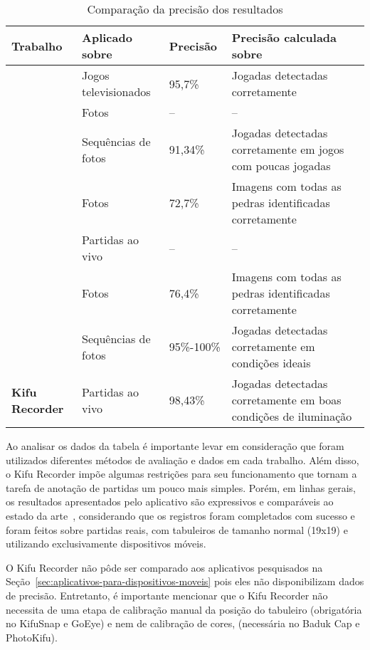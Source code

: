 \begin{table}[htb]
    \label{tab:comparacao-precisao}
    
    \begin{footnotesize}
    \begin{center}
    \begin{tabular}{p{4.6cm}|p{3.2cm}|p{1.6cm}|p{5cm}}
    
    \textbf{Trabalho} & \textbf{Aplicado sobre} & \textbf{Precisão} & \textbf{Precisão calculada sobre}\\
    \hline
    \cite{yanai06} & Jogos televisionados & 95,7\% & Jogadas detectadas corretamente\\
    \hline
    \cite{hirsimaki05} & Fotos & -- & --\\
    \hline
    \cite{scher08} & Sequências de fotos & 91,34\% & Jogadas detectadas corretamente em jogos com poucas jogadas\\
    \hline
    \cite{seewald10} & Fotos & 72,7\% & Imagens com todas as pedras identificadas corretamente\\
    \hline
    \cite{srisuphab12} & Partidas ao vivo & -- & --\\
    \hline
    \cite{musil14} & Fotos & 76,4\% & Imagens com todas as pedras identificadas corretamente\\
    \hline
    \cite{carta15} & Sequências de fotos & 95\%-100\% & Jogadas detectadas corretamente em condições ideais\\
    \hline
    \hline
    \textbf{Kifu Recorder} & Partidas ao vivo & 98,43\% & Jogadas detectadas corretamente em boas condições de iluminação\\
    \end{tabular}
    \end{center}
    \end{footnotesize}
    \caption{Comparação da precisão dos resultados}
\end{table}

Ao analisar os dados da tabela é importante levar em consideração que foram utilizados diferentes métodos de avaliação e dados em cada trabalho. Além disso, o Kifu Recorder impõe algumas restrições para seu funcionamento que tornam a tarefa de anotação de partidas um pouco mais simples. Porém, em linhas gerais, os resultados apresentados pelo aplicativo são expressivos e comparáveis ao estado da arte~\cite{carta15}, considerando que os registros foram completados com sucesso e foram feitos sobre partidas reais, com tabuleiros de tamanho normal (19x19) e utilizando exclusivamente dispositivos móveis.

O Kifu Recorder não pôde ser comparado aos aplicativos pesquisados na Seção~\ref{sec:aplicativos-para-dispositivos-moveis} pois eles não disponibilizam dados de precisão. Entretanto, é importante mencionar que o Kifu Recorder não necessita de uma etapa de calibração manual da posição do tabuleiro (obrigatória no KifuSnap e GoEye) e nem de calibração de cores, (necessária no Baduk Cap e PhotoKifu).
